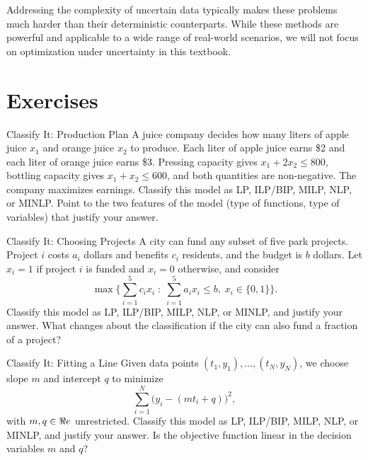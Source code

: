 Addressing the complexity of uncertain data typically makes these problems much harder than their deterministic counterparts. While these methods are powerful and applicable to a wide range of real-world scenarios, we will not focus on optimization under uncertainty in this textbook.

\section{Exercises}


\begin{ex}{Classify It: Production Plan}{}
 A juice company decides how many liters of apple juice $x_1$ and orange juice $x_2$ to produce.  Each liter of apple juice earns \$2 and each liter of orange juice earns \$3.  Pressing capacity gives $x_1 + 2x_2 \leq 800$, bottling capacity gives $x_1 + x_2 \leq 600$, and both quantities are non-negative.  The company maximizes earnings.  Classify this model as LP, ILP/BIP, MILP, NLP, or MINLP.  Point to the two features of the model (type of functions, type of variables) that justify your answer.
\end{ex}

\begin{ex}{Classify It: Choosing Projects}{}
\label{ex:classify-projects}
 A city can fund any subset of five park projects.  Project $i$ costs $a_i$ dollars and benefits $c_i$ residents, and the budget is $b$ dollars.  Let $x_i = 1$ if project $i$ is funded and $x_i = 0$ otherwise, and consider
\[
\max \Big\{ \sum_{i=1}^5 c_i x_i \;:\; \sum_{i=1}^5 a_i x_i \leq b, \; x_i \in \{0,1\} \Big\}.
\]
Classify this model as LP, ILP/BIP, MILP, NLP, or MINLP, and justify your answer.  What changes about the classification if the city can also fund a fraction of a project?
\end{ex}

\begin{ex}{Classify It: Fitting a Line}{}
 Given data points $(t_1,y_1), \dots, (t_N,y_N)$, we choose slope $m$ and intercept $q$ to minimize
\[
\sum_{i=1}^N \big(y_i - (mt_i + q)\big)^2 ,
\]
with $m, q \in \Re e$ unrestricted.  Classify this model as LP, ILP/BIP, MILP, NLP, or MINLP, and justify your answer.  Is the objective function linear in the decision variables $m$ and $q$?
\end{ex}

